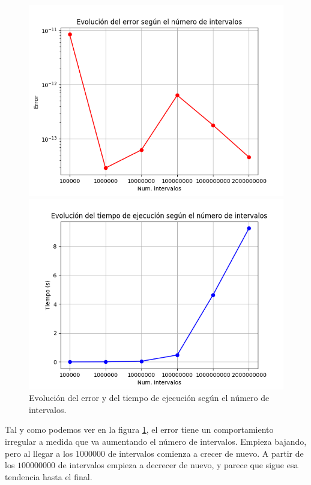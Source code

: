 \documentclass[11pt,a4paper]{article}
\begin{document}
\begin{figure}[H]
  \centering
  \begin{minipage}{.5\textwidth}
    \centering
    \includegraphics[scale=0.45]{img/evo-error}
  \end{minipage}%
  \begin{minipage}{.5\textwidth}
    \centering
    \includegraphics[scale=0.45]{img/evo-tiempo}
  \end{minipage}
  \caption{Evolución del error y del tiempo de ejecución según el número de intervalos.}
  \label{fig:intervalos}
\end{figure}

Tal y como podemos ver en la figura \ref{fig:intervalos}, el error tiene un comportamiento
irregular a medida que va aumentando el número de intervalos. Empieza bajando, pero al llegar
a los $1000000$ de intervalos comienza a crecer de nuevo. A partir de los $100000000$ de
intervalos empieza a decrecer de nuevo, y parece que sigue esa tendencia hasta el final.
\end{document}
